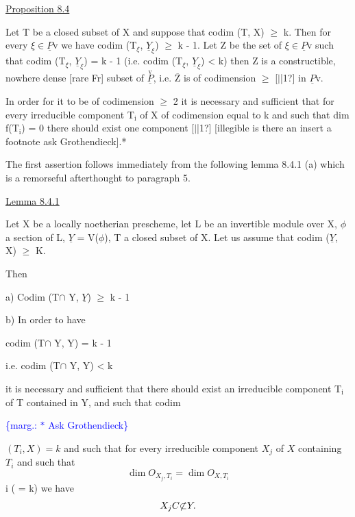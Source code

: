 \documentclass[11pt]{article}
\newcommand{\scanpage}[1]{\par\bigskip\noindent{\small\sffamily[scan #1]}\par}
\newcommand{\mspage}[1]{{\small\sffamily[p.\,#1]}}
\let\over\relax
\newcommand{\over}[2]{\textcolor{gray}{#1}\textcolor{blue}{\ensuremath{^{\!\nearrow}}#2}}
\newcommand{\margin}[1]{\textcolor{blue}{\{\textsf{marg.:} #1\}}}
\newcommand{\uline}[1]{\underline{#1}}
\newcommand{\unsure}[1]{[#1?]}
\begin{document}
\uline{Proposition 8.4}

Let T be a closed subset of X and suppose that codim (T, X) $\geq$
k. Then for every $\xi \in \underline{P}$v we have codim (T$_{\xi}$, $\underline{Y}_{\xi}$) $\geq$ k - 1. Let Z be
the set of $\xi \in \underline{P}$v such that codim (T$_{\xi}$, $\underline{Y}_{\xi}$) = k - 1 (i.e. codim (T$_{\xi}$,
$\underline{Y}_{\xi}$) < k) then Z is a constructible, nowhere dense [rare Fr]
subset of $\overset{\text{v}}{\underline{P}}$, i.e. $\overline{\text{Z}}$ is of codimension $\geq$ \unsure{$|$|1} in $\underline{P}$v.

In order for it to be of codimension $\geq$ 2 it is necessary and
sufficient that for every irreducible component T$_{\text{i}}$ of X of
codimension equal to k and such that dim f(T$_{\text{i}}$) = 0 there should
exist one component \unsure{$|$|1} [illegible is there an insert a footnote ask
Grothendieck].*

The first assertion follows immediately from the following lemma
8.4.1 (a) which is a remorseful afterthought to paragraph 5.

\uline{Lemma 8.4.1}

Let X be a locally noetherian prescheme, let L be an
invertible module over X, $\phi$ a section of L, $\underline{Y}$ = V($\phi$), T a closed
subset of X. Let us assume that codim ($\underline{Y}$, X) $\geq$ K.

Then

a) Codim (T$\cap$ Y, $\underline{Y}$) $\geq$ k - 1

b) In order to have

codim (T$\cap$ Y, Y) = k - 1

i.e. codim (T$\cap$ Y, Y) < k

it is necessary and sufficient that there should exist an
irreducible component T$_{\text{i}}$ of T contained in Y, and such that codim

\margin{$*$ Ask Grothendieck}

\clearpage
\scanpage{24/40}
\mspage{40}

$(T_i, X) = k$ and such that for every irreducible component $X_j$ of $X$
containing $T_i$ and such that
\[ \dim O_{X_j, T_i} = \dim O_{X, T_i} \]
i ( = k) we have
\[ X_j \over{C}{\not\subset} Y. \]
\end{document}

